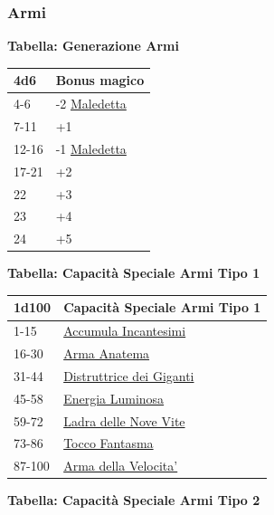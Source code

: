 \begin{multicols}{2}
{\subsubsection{Armi}

\textbf{Tabella: Generazione Armi}\hypertarget{armimagiche}{}\label{armimagiche}

\medskip

{\small\begin{tabularx}{\linewidth}{ll}
		\toprule
\textbf{4d6} & \textbf{Bonus magico}\\
\toprule
4-6 & -2 \hyperlink{Arma maledetta}{Maledetta}\\
7-11 &+1\\
12-16 & -1 \hyperlink{Arma maledetta}{Maledetta}\\
17-21 & +2\\
22 & +3\\
23 & +4\\
24 &+5\\
\end{tabularx}}

\textbf{Tabella: Capacità Speciale Armi Tipo 1}\hypertarget{Capacità Speciale Armi Tipo 1}{}

\medskip

{\small \begin{tabularx}{\linewidth}{ll}
		\toprule
\textbf{1d100} & \textbf{Capacità Speciale Armi Tipo 1}\\
\toprule
1-15 &\hyperlink{Accumula Incantesimi}{Accumula Incantesimi}\\
16-30 &\hyperlink{Arma Anatema}{Arma Anatema}\\
31-44 & \hyperlink{Distruttrice dei Giganti}{Distruttrice dei Giganti}\\
45-58 & \hyperlink{Energia Luminosa}{Energia Luminosa}\\
59-72 & \hyperlink{Ladra delle NoveVite}{Ladra delle Nove Vite}\\
73-86 & \hyperlink{Tocco Fantasma}{Tocco Fantasma}\\
87-100 & \hyperlink{Arma della Velocita'}{Arma della Velocita'}\\
\end{tabularx}
}
\medskip


\textbf{Tabella: Capacità Speciale Armi Tipo 2}\hypertarget{Capacità Speciale Armi Tipo 2}{}

}
\end{multicols}
